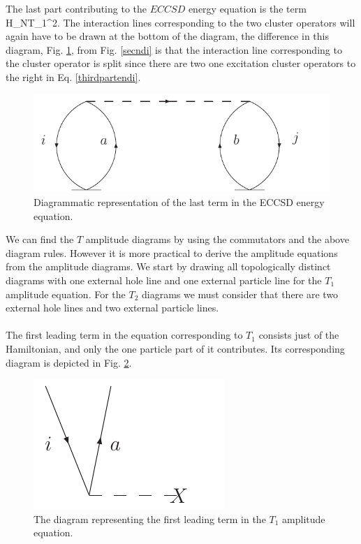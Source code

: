 The last part contributing to the $ECCSD$ energy equation is the
term 
\be
{}H_NT_1^2.
\label{thirdpartendi}
\ee
The interaction lines corresponding to the two cluster operators
will again have to be drawn at the bottom of the diagram, the 
difference in this diagram, Fig. \ref{thirdenedi}, from 
Fig. \ref{secndi} is that the 
interaction line corresponding to the cluster operator is 
split since there are two one excitation cluster operators to
the right in Eq. \eqref{thirdpartendi}. 
\begin{figure}[htp]
\centering
\includegraphics[scale=0.75]{thirdenedi}
\caption{Diagrammatic representation of the last term in the 
ECCSD energy equation.}
\label{thirdenedi}
\end{figure}
We can find the $T$ amplitude diagrams by using the commutators and the above diagram rules. However it is more practical to derive the amplitude equations from the amplitude diagrams. We start by
drawing all topologically distinct diagrams with  one external hole line and one external particle line for 
the $T_1$ amplitude equation. For the $T_2$ diagrams we must consider that there are two external hole 
lines and two external particle lines.\\
\\
The first leading term 
in the equation corresponding to $T_1$ consists just of the Hamiltonian, and 
only the one particle part of it contributes. Its corresponding diagram is
depicted in Fig. \ref{firstamplt1}.  
\begin{figure}[htp]
\centering
\includegraphics[scale=0.75]{firstampl}
\caption{The diagram representing the first leading term in the
$T_1$ amplitude equation.}
\label{firstamplt1}
\end{figure} 
